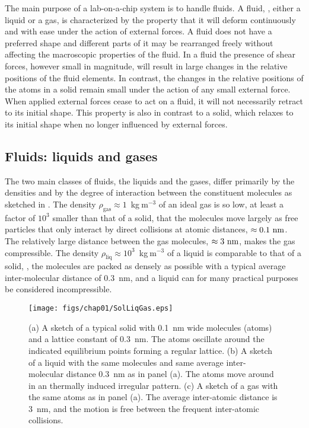 The main purpose of a lab-on-a-chip system is to handle fluids. A
fluid, \ie, either a liquid or a gas, is characterized by the
property that it will deform continuously and with ease under the
action of external forces. A fluid does not have a preferred shape
and different parts of it may be rearranged freely without
affecting the macroscopic properties of the fluid. In a fluid the
presence of shear forces, however small in magnitude, will result
in large changes in the relative positions of the fluid elements.
In contrast, the changes in the relative positions of the atoms in
a solid remain small under the action of any small external force.
When applied external forces cease to act on a fluid, it will not
necessarily retract to its initial shape. This property is also in
contrast to a solid, which relaxes to its initial shape when no
longer influenced by external forces.


\subsection{Fluids: liquids and gases}

The two main classes of fluids, the liquids and the gases, differ
primarily by the densities and by the degree of interaction
between the constituent molecules as sketched in
. The density $\rho^{{}}_\textrm{gas} \approx
1$~kg$\:$m$^{-3}$ of an ideal
gas is so low, at least a factor of $10^3$ smaller than that of a
solid, that the molecules move largely as free particles that only
interact by direct collisions at atomic distances, $\approx
0.1~\textrm{nm}$. The relatively large distance between the gas
molecules, $\approx 3~\textrm{nm}$, makes the gas compressible. The
density $\rho^{{}}_\textrm{liq} \approx 10^3$~kg$\:$m$^{-3}$ of a
liquid is comparable to that of a solid, \ie, the molecules are
packed as densely as possible with a typical average
inter-molecular distance of 0.3~nm, and a liquid can for many
practical purposes be considered incompressible.

\begin{figure}
\centerline{
  \texttt{[image: figs/chap01/SolLiqGas.eps]}}
\caption[Molecular picture of solids, liquids and gases]
{ (a) A sketch of a typical solid with 0.1~nm
wide molecules (atoms) and a lattice constant of 0.3~nm. The atoms
oscillate around the indicated equilibrium points forming a
regular lattice. (b) A sketch of a liquid with the same molecules
and same average inter-molecular distance 0.3~nm as in panel (a).
The atoms move around in an thermally induced irregular pattern.
(c) A sketch of a gas with the same atoms as in panel (a). The
average inter-atomic distance is 3~nm, and the motion is free
between the frequent inter-atomic collisions.}
\end{figure}

